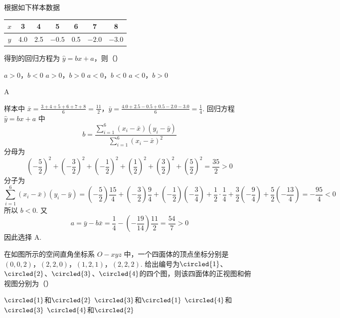 \begin{problem}
根据如下样本数据

\begin{center}
\begin{tabular}{c|cccccc}
\hline
\(x\) & 3 & 4 & 5 & 6 & 7 & 8 \\
\hline
\(y\) & 4.0 & 2.5 & \(-0.5\) & 0.5 & \(-2.0\) & \(-3.0\) \\
\hline
\end{tabular}
\end{center}

得到的回归方程为 \(\hat{y} = bx + a\)，则（\quad）

\choices
    {\(a > 0\)，\(b < 0\)}
    {\(a > 0\)，\(b > 0\)}
    {\(a < 0\)，\(b < 0\)}
    {\(a < 0\)，\(b > 0\)}
\end{problem}

\begin{answer}
A
\end{answer}

\begin{solution}
样本中 \(\bar{x}=\frac{3+4+5+6+7+8}{6}=\frac{11}{2}\)，\(\bar{y}=\frac{4.0+2.5-0.5+0.5-2.0-3.0}{6}=\frac14\).
回归方程 \(\hat y=bx+a\) 中
\[
b=\frac{\sum_{i=1}^{6}(x_i-\bar x)(y_i-\bar y)}
{\sum_{i=1}^{6}(x_i-\bar x)^2}
\]
分母为
\[
\left(-\frac52\right)^2+\left(-\frac32\right)^2+\left(-\frac12\right)^2+\left(\frac12\right)^2+\left(\frac32\right)^2+\left(\frac52\right)^2=\frac{35}{2}>0
\]
分子为
\[
\sum_{i=1}^{6}(x_i-\bar x)(y_i-\bar y)
=\left(-\frac52\right)\frac{15}{4}+\left(-\frac32\right)\frac94+\left(-\frac12\right)\left(-\frac34\right)+\frac12\cdot\frac14+\frac32\left(-\frac94\right)+\frac52\left(-\frac{13}{4}\right)=-\frac{95}{4}<0
\]
所以 \(b<0\). 又
\[
a=\bar y-b\bar x=\frac14-\left(-\frac{19}{14}\right)\frac{11}{2}=\frac{54}{7}>0
\]
因此选择 A.
\end{solution}

\begin{problem}
在如图所示的空间直角坐标系 \(O-xyz\) 中，一个四面体的顶点坐标分别是 \((0,0,2)\)，\((2,2,0)\)，\((1,2,1)\)，\((2,2,2)\). 给出编号为\(\circled{1}\)、\(\circled{2}\)、\(\circled{3}\)、\(\circled{4}\)的四个图，则该四面体的正视图和俯视图分别为（\quad）


\choices
    {\(\circled{1}\)和\(\circled{2}\)}
    {\(\circled{3}\)和\(\circled{1}\)}
    {\(\circled{4}\)和\(\circled{3}\)}
    {\(\circled{4}\)和\(\circled{2}\)}
\end{problem}

